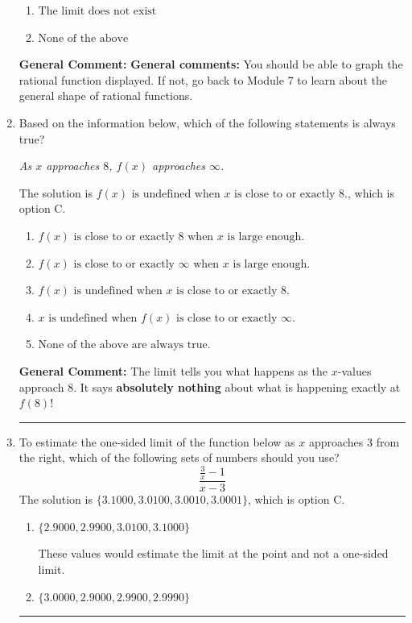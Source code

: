 \documentclass{extbook}[14pt]
\newcommand{\litem}[1]{\item #1

\rule{\textwidth}{0.4pt}}
\begin{document}
\begin{enumerate}
{\begin{enumerate}[label=\Alph*.]
\item \( \text{The limit does not exist} \)


\item \( \text{None of the above} \)


\end{enumerate}

\textbf{General Comment:} \textbf{General comments:} You should be able to graph the rational function displayed. If not, go back to Module 7 to learn about the general shape of rational functions.
}
\litem{
Based on the information below, which of the following statements is always true?

\begin{center}
    \textit{ As $x$ approaches $8$, $f(x)$ approaches $\infty$. }
\end{center}
The solution is \( f(x) \text{ is undefined when } x \text{ is close to or exactly } 8. \), which is option C.\begin{enumerate}[label=\Alph*.]
\item \( f(x) \text{ is close to or exactly } 8 \text{ when } x \text{ is large enough}. \)


\item \( f(x) \text{ is close to or exactly } \infty \text{ when } x \text{ is large enough}. \)


\item \( f(x) \text{ is undefined when } x \text{ is close to or exactly } 8. \)


\item \( x \text{ is undefined when } f(x) \text{ is close to or exactly } \infty. \)


\item \( \text{None of the above are always true.} \)


\end{enumerate}

\textbf{General Comment:} The limit tells you what happens as the $x$-values approach $8$. It says \textbf{absolutely nothing} about what is happening exactly at $f(8)$!
}
\litem{
To estimate the one-sided limit of the function below as $x$ approaches 3 from the right, which of the following sets of numbers should you use?
\[ \frac{\frac{3}{x} - 1}{x - 3} \]The solution is \( \{ 3.1000, 3.0100, 3.0010, 3.0001 \} \), which is option C.\begin{enumerate}[label=\Alph*.]
\item \( \{ 2.9000, 2.9900, 3.0100, 3.1000 \} \)

These values would estimate the limit at the point and not a one-sided limit.
\item \( \{ 3.0000, 2.9000, 2.9900, 2.9990 \} \)


\end{enumerate}}
\end{enumerate}
\end{document}
